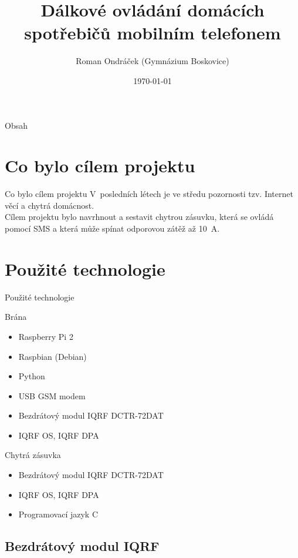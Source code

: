 \documentclass[11pt]{beamer}
\author[Roman Ondráček]{Roman Ondráček (Gymnázium Boskovice)}
\title[Dálkové ovládání domácích spotřebičů]{Dálkové ovládání domácích spotřebičů mobilním telefonem}
\institute[]{Školitel: prof. Ing. Václav Říčný, CSc. (FEKT VUT)}
\date{\today}
\begin{document}
\begin{frame}
\titlepage
\end{frame}

\begin{frame}{Obsah}
\tableofcontents
\end{frame}

\section{Co bylo cílem projektu}

\begin{frame}{Co bylo cílem projektu}
V~posledních létech je ve středu pozornosti tzv. Internet věcí a chytrá domácnost. \\[4mm]
Cílem projektu bylo navrhnout a sestavit chytrou zásuvku, která se ovládá pomocí SMS a která může spínat odporovou zátěž až 10~A.
\end{frame}

\section{Použité technologie}

\begin{frame}{Použité technologie}
  \begin{exampleblock}{Brána}
    \begin{itemize}
      \item Raspberry Pi 2
      \item Raspbian (Debian)
      \item Python
      \item USB GSM modem
      \item Bezdrátový modul IQRF DCTR-72DAT
      \item IQRF OS, IQRF DPA
    \end{itemize}
  \end{exampleblock}
  \begin{alertblock}{Chytrá zásuvka}
    \begin{itemize}
      \item Bezdrátový modul IQRF DCTR-72DAT
      \item IQRF OS, IQRF DPA
      \item Programovací jazyk C
    \end{itemize}
  \end{alertblock}
\end{frame}

\subsection{Bezdrátový modul IQRF}
\end{document}
